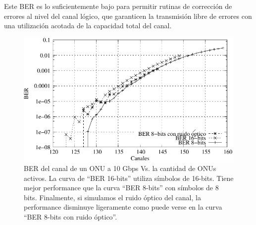Este BER es lo suficientemente bajo para permitir rutinas de corrección de errores al nivel del canal lógico, que garanticen la transmisión libre de errores con una utilización acotada de la capacidad total del canal.

\begin{figure}[t]
  \centering
  \includegraphics[width=5in]{graphs/BER-tesis.pdf} 
  \caption{BER del canal de un ONU a 10 Gbps Vs. la cantidad de ONUs activos. La curva de ``BER 16-bits'' utiliza símbolos de 16-bits. Tiene mejor performance que la curva ``BER 8-bits'' con símbolos de 8 bits. Finalmente, si simulamos el ruido óptico del canal, la performance disminuye ligeramente como puede verse en la curva ``BER 8-bits con ruido óptico''.}
  \label{sim:access}
\end{figure}


